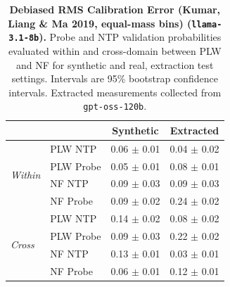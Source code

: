 \begin{table}[ht]
\centering
\begin{tabular}{ll cc}
\toprule
& & Synthetic & Extracted \\
\midrule
\multirow{4}{*}{\textit{Within}}
& PLW NTP & 0.06 $\pm$ 0.01 & 0.04 $\pm$ 0.02 \\
& PLW Probe & 0.05 $\pm$ 0.01 & 0.08 $\pm$ 0.01 \\
& NF NTP & 0.09 $\pm$ 0.03 & 0.09 $\pm$ 0.03 \\
& NF Probe & 0.09 $\pm$ 0.02 & 0.24 $\pm$ 0.02 \\
\midrule
\multirow{4}{*}{\textit{Cross}}
& PLW NTP & 0.14 $\pm$ 0.02 & 0.08 $\pm$ 0.02 \\
& PLW Probe & 0.09 $\pm$ 0.03 & 0.22 $\pm$ 0.02 \\
& NF NTP & 0.13 $\pm$ 0.01 & 0.03 $\pm$ 0.01 \\
& NF Probe & 0.06 $\pm$ 0.01 & 0.12 $\pm$ 0.01 \\
\bottomrule
\end{tabular}
\caption{\textbf{Debiased RMS Calibration Error (Kumar, Liang \& Ma 2019, equal-mass bins) (\texttt{llama-3.1-8b}).} Probe and NTP validation probabilities evaluated within and cross-domain between PLW and NF for synthetic and real, extraction test settings. Intervals are 95\% bootstrap confidence intervals. Extracted measurements collected from \texttt{gpt-oss-120b}.}
\label{tab:llama-3.1-8b-gpt-oss-120b-pond_nfix-rmsce_db}
\end{table}
